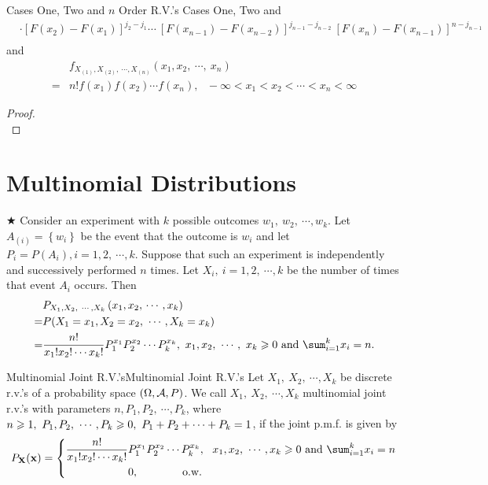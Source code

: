 \documentclass{elegantbook}
\begin{document}
\begin{corollary}{Cases One, Two and $n$ Order R.V.'s }{Cases One, Two and}
\[\begin{aligned}
&\cdot\left\lbrack F( x_{2} ) - F( x_{1} ) \right\rbrack^{j_{2} - j_{1}}\cdots\ \left\lbrack F( x_{n - 1} ) - F( x_{n - 2} ) \right\rbrack^{j_{n - 1} - j_{n - 2}}\ \left\lbrack F( x_{n} ) - F( x_{n - 1} ) \right\rbrack^{n - j_{n - 1}}\\
\end{aligned}\]
and
\[\begin{aligned}
&f_{X_{\left( 1 \right)},X_{\left( 2 \right)},\ \cdots,X_{\left( n \right)}}\left( x_{1},x_{2},\ \cdots,\ x_{n} \right)\\
=& n!f(x_{1})f(x_{2})\cdots f(x_{n}),\ \ \  - \infty < x_{1} < x_{2} < \cdots < x_{n} < \infty
\end{aligned}\]
\end{corollary}

\begin{proof}
\\[4cm]\vspace{0.01cm}
\end{proof}

\section{Multinomial Distributions}

$\bigstar$ Consider an experiment with \(k\) possible outcomes \(w_{1},\ w_{2},\ \cdots,w_{k}\). Let \(A_{\left( i \right)} = \left\{ w_{i} \right\}\) be the event that the outcome is \(w_{i}\) and let \(P_{i} = P(A_{i}),i = 1,2,\ \cdots,k.\) Suppose that such an experiment is independently and successively performed \(n\) times. Let \(X_{i},\ i = 1,2,\ \cdots,k\) be the number of times that event \(A_{i}\) occurs. Then
\[\begin{aligned}
&P_{X_{1},X_{2},\ \cdots,X_{k}}\left( x_{1},x_{2},\, \cdots,x_{k} \right) \\
=& P( X_{1} = x_{1},X_{2} = x_{2},\ \cdots,X_{k} = x_{k} )\\
=& \dfrac{n!}{x_{1}!x_{2}!\cdots x_{k}!}P_{1}^{x_{1}}P_{2}^{x_{2}}\cdots P_{k}^{x_{k}},\ x_{1},x_{2},\ \cdots,\ x_{k} \gs 0\ \mathrm{\text{and}}\ \sum_{i=1}^k x_i=n.
\end{aligned}\]

\begin{definition}{Multinomial Joint R.V.'s}{Multinomial Joint R.V.'s}
Let \(X_{1},\ X_{2},\ \cdots,X_{k}\) be discrete r.v.'s of a probability space $(\Omega,\mathcal{A}, P)$. We call \(X_{1},\ X_{2},\ \cdots,X_{k}\) multinomial joint r.v.'s with parameters \(n,P_{1},P_{2},\ \cdots,P_{k}\), where \(n \geqslant 1,\ P_{1},P_{2},\ \cdots,P_{k} \geqslant 0,\ P_{1} + P_{2} + \cdots + P_{k} = 1\), if the joint p.m.f. is given by
\[P_{\mX}(\mx) = \left\{ \begin{aligned}
\frac{n!}{x_{1}!x_{2}!\cdots x_{k}!} & P_{1}^{x_{1}}P_{2}^{x_{2}}\cdots P_{k}^{x_{k}},\ \mathrm{\ }x_{1},x_{2},\ \cdots,x_{k} \gs 0\ \mathrm{\text{and}}\ \sum_{i=1}^k x_i=n \\
&0, \qquad\qquad\mathrm{\text{o.w.}}\\
\end{aligned} \right.\]
\end{definition}
\end{document}

